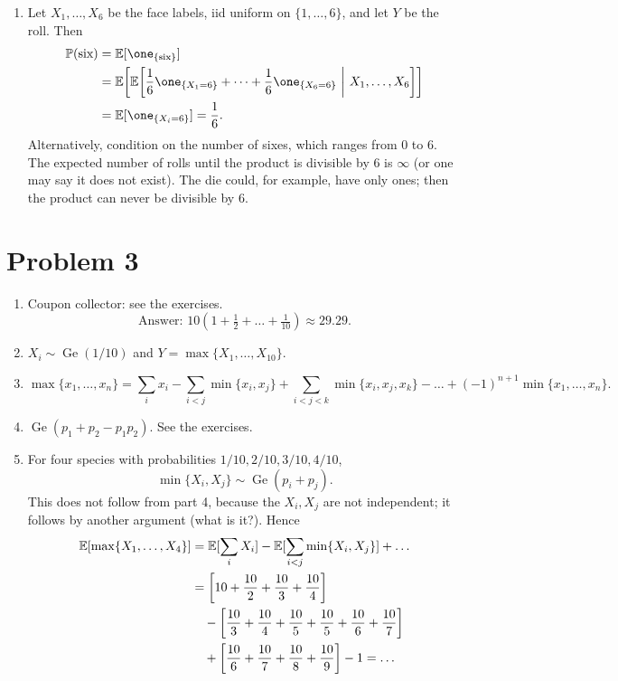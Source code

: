 \documentclass[a4paper]{article}
\begin{document}
\begin{enumerate}
\begin{align*}
&=\frac{48!}{20!28!}\frac{20!32!}{52!}
-\frac{48!}{30!18!}\frac{30!22!}{52!}\\
&=\frac{29\cdot30\cdot31\cdot32}{49\cdot50\cdot51\cdot52}
-\frac{19\cdot20\cdot21\cdot22}{49\cdot50\cdot51\cdot52}
\approx10.58\%.
\end{align*}
\item Let $X_1,\dots,X_6$ be the face labels, iid uniform on $\{1,\dots,6\}$, and let $Y$ be the roll. Then
\begin{align*}
\P(\text{six})&=\E[\one_{\{\text{six}\}}]\\
&=\E\!\left[\E\!\left[\frac16\one_{\{X_1=6\}}+\dots+
\frac16\one_{\{X_6=6\}}\ \middle|\ X_1,\dots,X_6\right]\right]\\
&=\E[\one_{\{X_i=6\}}]=\frac16.
\end{align*}
Alternatively, condition on the number of sixes, which ranges from 0 to 6.
The expected number of rolls until the product is divisible by 6 is $\infty$ (or one may say it does not exist).
The die could, for example, have only ones; then the product can never be divisible by 6.
\end{enumerate}

\section*{Problem 3}
\begin{enumerate}
\item Coupon collector: see the exercises.
\[
\text{Answer: }10(1+\tfrac12+\dots+\tfrac1{10})\approx29.29.
\]
\item $X_i\sim\operatorname{Ge}(1/10)$ and $Y=\max\{X_1,\dots,X_{10}\}$.
\item
\[
\max\{x_1,\dots,x_n\}=
\sum_i x_i-\sum_{i<j}\min\{x_i,x_j\}
+\sum_{i<j<k}\min\{x_i,x_j,x_k\}-\dots
+(-1)^{n+1}\min\{x_1,\dots,x_n\}.
\]
\item $\operatorname{Ge}(p_1+p_2-p_1p_2)$. See the exercises.
\item For four species with probabilities $1/10,2/10,3/10,4/10$,
\[
\min\{X_i,X_j\}\sim\operatorname{Ge}(p_i+p_j).
\]
This does not follow from part 4, because the $X_i,X_j$ are not independent; it follows by another argument (what is it?).
Hence
\begin{align*}
\mathbb {E}[\max\{X_1,\dots,X_4\}]
&=\mathbb {E}[\sum_iX_i]-\mathbb {E}[\sum_{i<j}\min\{X_i,X_j\}]+\dots\\
&=\left[10+\frac{10}{2}+\frac{10}{3}+\frac{10}{4}\right]\\
&\quad-\left[\frac{10}{3}+\frac{10}{4}+\frac{10}{5}+
\frac{10}{5}+\frac{10}{6}+\frac{10}{7}\right]\\
&\quad+\left[\frac{10}{6}+\frac{10}{7}+\frac{10}{8}+\frac{10}{9}\right]-1=\dots
\end{align*}
\end{enumerate}
\end{document}
